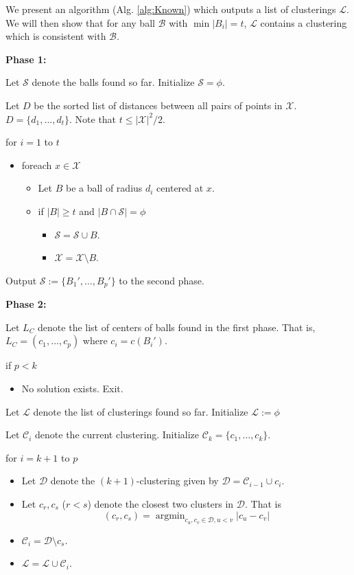 \documentclass[twoside]{article}
\newcommand{\mc}{\mathcal}
\newenvironment{alg}{
    \begin{list}{}{
        \setlength{\itemsep}{2pt}
        \setlength{\parsep}{0pt}
        \setlength{\parskip}{0pt}
        \setlength{\topsep}{1pt}
    }
}
{
    \end{list}
}
\DeclareMathOperator{\argmin}{argmin}
\begin{document}
We present an algorithm (Alg. \ref{alg:Known}) which outputs a list of clusterings $\mc L$. We will then show that for any ball $\mc B$ with $\min |B_i| = t$, $\mc L$ contains a clustering which is consistent with $\mc B$.
\begin{algorithm}
\begin{alg}
\item[] \textbf{Phase 1:}
\item[] Let $\mc S$ denote the balls found so far. Initialize $\mc S = \phi$.
\item[] Let $D$ be the sorted list of distances between all pairs of points in $\mc X$. $D = \{d_1,\ldots,d_t\}$. Note that $t \le |\mc X|^2/2$.
\item[] for $i=1$ to $t$
\begin{itemize}
\item[] foreach $x \in \mc X$
\begin{itemize}
\item[] Let $B$ be a ball of radius $d_i$ centered at $x$.
\item[] if $|B| \ge t$ and $|B \cap \mathcal{S} | = \phi$
\begin{itemize}
\item[] $\mathcal{S} = \mathcal{S} \cup B$. 
\item[] $\mc X = \mc X\setminus B$.
\end{itemize}
\end{itemize}
\end{itemize}
\item[] Output $\mc S := \{B_1',\ldots,B_p'\}$ to the second phase.

\item[] \textbf{Phase 2:}
\item[] Let $L_C$ denote the list of centers of balls found in the first phase. That is, $L_C = (c_1,\ldots,c_p)$ where $c_i = c(B_i')$.
\item[] if $p < k$
\begin{itemize}
	\item[] No solution exists. Exit. 
\end{itemize}
\item[] Let $\mc L$ denote the list of clusterings found so far. Initialize $\mc L := \phi$
\item[] Let $\mc C_i$ denote the current clustering. Initialize $\mc C_k = \{c_1,\ldots,c_k\}$.
\item[] for $i=k+1$ to $p$
\begin{itemize}
\item[] Let $\mc D$ denote the $(k+1)$-clustering given by $\mc D = \mc C_{i-1} \cup c_i$. 
\item[] Let $c_r, c_s$ ($r < s$) denote the closest two clusters in $\mc D$. That is $$(c_r, c_s) = \argmin_{c_u,c_v \in \mc D, u < v} |c_u -c_v|$$
\item[] $\mc C_i = \mc D \setminus c_s$.
\item[] $\mc L = \mc L \cup \mc C_i$.


\end{itemize}
\end{alg}
\end{algorithm}
\end{document}
